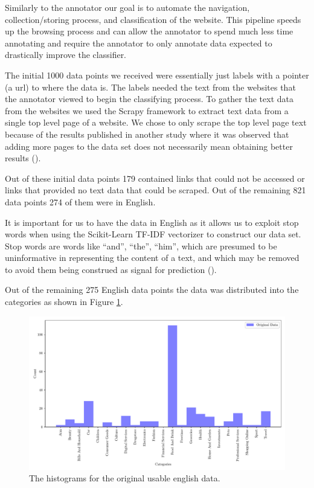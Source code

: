 Similarly to the annotator our goal is to automate the navigation, collection/storing process, and classification of the website. This pipeline speeds up the browsing process and can allow the annotator to spend much less time annotating and require the annotator to only annotate data expected to drastically improve the classifier.

The initial 1000 data points we received were essentially just labels with a pointer (a url) to where the data is. The labels needed the text from the websites that the annotator viewed to begin the classifying process. To gather the text data from the websites we used the Scrapy framework to extract text data from a single top level page of a website. We chose to only scrape the top level page text because
of the results published in another study where it was observed that adding more pages to the data set does not necessarily mean obtaining better results (\cite{sahid2019ecommerce}). 

Out of these initial data points 179 contained links that could not be accessed or links that provided no text data that could be scraped. Out of the remaining 821 data points 274 of them were in English. 

It is important for us to have the data in English as it allows us to exploit stop words when using the Scikit-Learn TF-IDF vectorizer to construct our data set. Stop words are words like “and”, “the”, “him”, which are presumed to be uninformative in representing the content of a text, and which may be removed to avoid them being construed as signal for prediction (\cite{sklearn62feature}).

Out of the remaining 275 English data points the data was distributed into the categories as shown in Figure \ref{fig:og_en_hist}.

\begin{figure}[!ht]
  \centering
  \includegraphics[width=\textwidth]{../img/plot_og_en_hist.pdf}
  \caption{The histograms for the original usable english data.}
  \label{fig:og_en_hist}
\end{figure}

